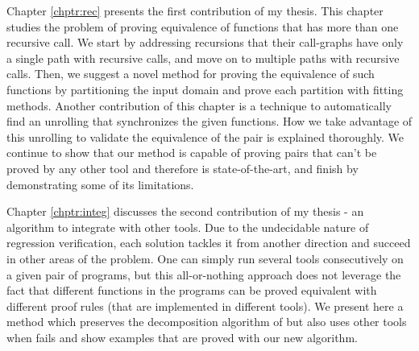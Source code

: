 Chapter \ref{chptr:rec} presents the first contribution of my thesis. This chapter studies the problem of proving equivalence of functions that has more than one recursive call. We start by addressing recursions that their call-graphs have only a single path with recursive calls, and move on to multiple paths with recursive calls. Then, we suggest a novel method for proving the equivalence of such functions by partitioning the input domain and prove each partition with fitting methods. Another contribution of this chapter is a technique to automatically find an unrolling that synchronizes the given functions. How we take advantage of this unrolling to validate the equivalence of the pair is explained thoroughly. We continue to show that our method is capable of proving pairs that can't be proved by any other tool and therefore is state-of-the-art, and finish by demonstrating some of its limitations.

Chapter \ref{chptr:integ} discusses the second contribution of my thesis - an algorithm to integrate  with other tools. Due to the undecidable nature of regression verification, each solution tackles it from another direction and succeed in other areas of the problem. One can simply run several tools consecutively on a given pair of programs, but this all-or-nothing approach does not leverage the fact that different functions in the programs can be proved equivalent with different proof rules (that are implemented in different tools). We present here a method which preserves the decomposition algorithm of  but also uses other tools when  fails and show examples that are proved with our new algorithm.

